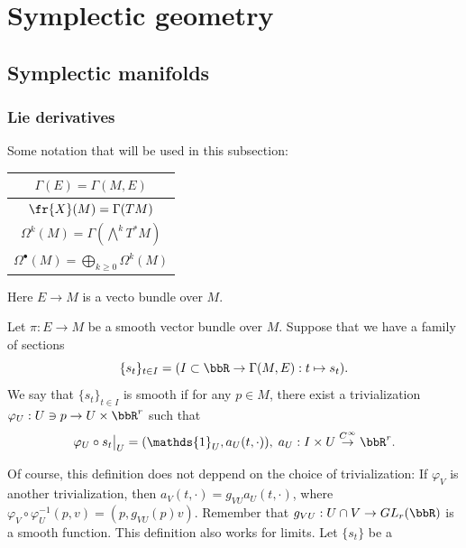 \chapter{Symplectic geometry}

\section{Symplectic manifolds}
\subsection{Lie derivatives}

Some notation that will be used in this subsection:
\begin{center}
    \begin{tabular}{|c|}
        \hline 
        $\Gamma(E)=\Gamma(M,E)$\\
        \hline 
        $\fr{X}(M)=\Gamma(TM)$\\
        \hline 
        $\Omega^k(M)=\Gamma(\bigwedge^kT^*M)$\\
        \hline 
        $\Omega^\bullet(M)=\bigoplus_{k\geq0}\Omega^k(M)$\\
        \hline
    \end{tabular}
\end{center}
Here $E\to M$ is a vecto bundle over $M$.
\begin{dang}
    \begin{definition}
        Let $\pi:E\to M$ be a smooth vector bundle over $M$. Suppose that we have a family of sections 
        \begin{equation}
        \{s_t\}_{t\in I} =  (I\subset\bbR\to \Gamma(M,E):t\mapsto s_t).
        \end{equation}
        We say that $\{s_t\}_{t\in I}$ is smooth if for any $p\in M$, there exist a trivialization 
        $\varphi_U:U\ni p\to U\times\bbR^r$ such that  
        \begin{equation}
            \varphi_U\circ s_t\big|_U=(\mathds{1}_U, a_U(t,\cdot)),\;a_U:I\times U\overset{C^\infty}{\rightarrow}\bbR^r.
        \end{equation}
    \end{definition}
\end{dang}
Of course, this definition does not deppend on the choice of trivialization: If $\varphi_V$ is another trivialization, then 
$a_V(t,\cdot)=g_{VU}a_U(t,\cdot)$, where $\varphi_V\circ\varphi_U^{-1}(p,v)=(p,g_{VU}(p)v)$. Remember that 
$g_{VU}:U\cap V\to GL_r(\bbR)$ is a smooth function. This definition also works for limits. Let $\{s_t\}$ be a 

